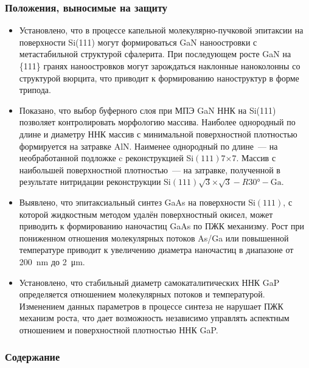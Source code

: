 \begin{frame}
    \setcounter{framenumber}{1}
    \maketitle
\end{frame}

\begin{frame}
    \frametitle{Положения, выносимые на защиту}
    \begin{itemize}
  \item	Установлено, что в процессе капельной молекулярно-пучковой эпитаксии на
    поверхности Si(111) могут формироваться GaN наноостровки с метастабильной
    структурой сфалерита. При последующем росте GaN
   на \{111\} гранях наноостровков могут зарождаться наклонные наноколонны со
   структурой вюрцита, что приводит к формированию наноструктур в форме
   трипода.
 \item Показано, что выбор буферного слоя при МПЭ GaN ННК на Si(111) позволяет
   контролировать морфологию массива. Наиболее однородный по длине и диаметру
   ННК массив с минимальной поверхностной плотностью формируется на затравке
   AlN. Наименее однородный по длине~--- на необработанной подложке c
   реконструкцией Si\((111)7\)\(\times\)\(7\). Массив с наибольшей
   поверхностной плотностью~--- на затравке, полученной в результате нитридации
   реконструкции Si\((111)\sqrt{3}\)\(\times\)\(\sqrt{3} - R30\si{\degree} -
   \text{Ga}\).
 \item Выявлено, что эпитаксиальный синтез GaAs на поверхности Si\((111)\), с
   которой жидкостным методом удалён поверхностный окисел, может приводить к
   формированию наночастиц GaAs по ПЖК механизму. Рост при пониженном отношения
   молекулярных потоков As/Ga или повышенной температуре приводит к увеличению
   диаметра наночастиц в диапазоне от 200~\si{\nano\metre} до
   2~\si{\micro\metre}.
 \item Установлено, что стабильный диаметр самокаталитических ННК GaP
   определяется отношением молекулярных потоков и температурой. Изменением
   данных параметров в процессе синтеза не нарушает ПЖК механизм роста, что
   дает возможность независимо управлять аспектным отношением и поверхностной
   плотностью ННК GaP.
    \end{itemize}
\end{frame}

\begin{frame}
    \frametitle{Содержание}
    \tableofcontents
\end{frame}
